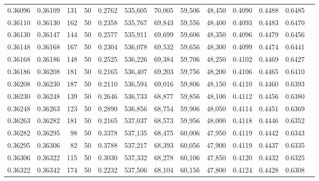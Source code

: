 \begin{tabular}{rrrrrrrrrrrrr}
0.36096 & 0.36109 &   131 &  50 &                                     0.2762 & 535,605 &  70,005 &  59,506 &  48,450 & 0.4090 & 0.4488 & 0.6485 \\
0.36110 & 0.36130 &   162 &  50 &                                     0.2358 & 535,767 &  69,843 &  59,556 &  48,400 & 0.4093 & 0.4483 & 0.6470 \\
0.36130 & 0.36147 &   144 &  50 &                                     0.2577 & 535,911 &  69,699 &  59,606 &  48,350 & 0.4096 & 0.4479 & 0.6456 \\
0.36148 & 0.36168 &   167 &  50 &                                     0.2304 & 536,078 &  69,532 &  59,656 &  48,300 & 0.4099 & 0.4474 & 0.6441 \\
0.36168 & 0.36186 &   148 &  50 &                                     0.2525 & 536,226 &  69,384 &  59,706 &  48,250 & 0.4102 & 0.4469 & 0.6427 \\
0.36186 & 0.36208 &   181 &  50 &                                     0.2165 & 536,407 &  69,203 &  59,756 &  48,200 & 0.4106 & 0.4465 & 0.6410 \\
0.36208 & 0.36230 &   187 &  50 &                                     0.2110 & 536,594 &  69,016 &  59,806 &  48,150 & 0.4110 & 0.4460 & 0.6393 \\
0.36230 & 0.36248 &   139 &  50 &                                     0.2646 & 536,733 &  68,877 &  59,856 &  48,100 & 0.4112 & 0.4456 & 0.6380 \\
0.36248 & 0.36263 &   123 &  50 &                                     0.2890 & 536,856 &  68,754 &  59,906 &  48,050 & 0.4114 & 0.4451 & 0.6369 \\
0.36263 & 0.36282 &   181 &  50 &                                     0.2165 & 537,037 &  68,573 &  59,956 &  48,000 & 0.4118 & 0.4446 & 0.6352 \\
0.36282 & 0.36295 &    98 &  50 &                                     0.3378 & 537,135 &  68,475 &  60,006 &  47,950 & 0.4119 & 0.4442 & 0.6343 \\
0.36295 & 0.36306 &    82 &  50 &                                     0.3788 & 537,217 &  68,393 &  60,056 &  47,900 & 0.4119 & 0.4437 & 0.6335 \\
0.36306 & 0.36322 &   115 &  50 &                                     0.3030 & 537,332 &  68,278 &  60,106 &  47,850 & 0.4120 & 0.4432 & 0.6325 \\
0.36322 & 0.36342 &   174 &  50 &                                     0.2232 & 537,506 &  68,104 &  60,156 &  47,800 & 0.4124 & 0.4428 & 0.6308 \\

\end{tabular}
